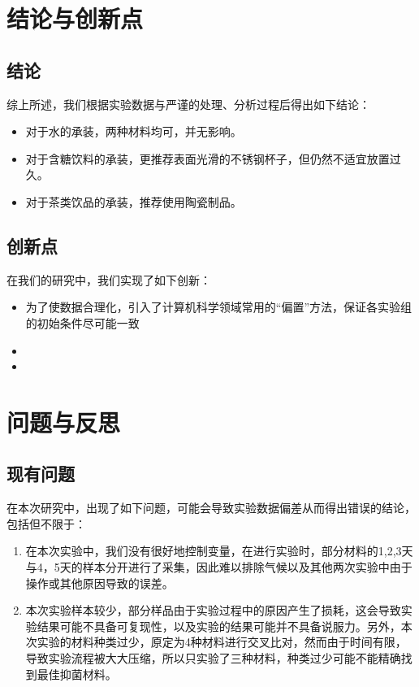 \documentclass[12pt,a4paper]{ctexart}
\begin{document}
\section{结论与创新点}
\subsection{结论}
综上所述，我们根据实验数据与严谨的处理、分析过程后得出如下结论：
\begin{itemize}
    \item 对于水的承装，两种材料均可，并无影响。
    \item 对于含糖饮料的承装，更推荐表面光滑的不锈钢杯子，但仍然不适宜放置过久。
    \item 对于茶类饮品的承装，推荐使用陶瓷制品。
\end{itemize}

\subsection{创新点}
在我们的研究中，我们实现了如下创新：
\begin{itemize}
    \item 为了使数据合理化，引入了计算机科学领域常用的“偏置”方法，保证各实验组的初始条件尽可能一致
    \item %
    \item %
\end{itemize}

\section{问题与反思}\label{sec:problem}
\subsection{现有问题}
在本次研究中，出现了如下问题，可能会导致实验数据偏差从而得出错误的结论，包括但不限于：
\begin{enumerate}
    \item 在本次实验中，我们没有很好地控制变量，在进行实验时，部分材料的1,2,3天与4，5天的样本分开进行了采集，因此难以排除气候以及其他两次实验中由于操作或其他原因导致的误差。
    \item 本次实验样本较少，部分样品由于实验过程中的原因产生了损耗，这会导致实验结果可能不具备可复现性，以及实验的结果可能并不具备说服力。另外，本次实验的材料种类过少，原定为4种材料进行交叉比对，然而由于时间有限，导致实验流程被大大压缩，所以只实验了三种材料，种类过少可能不能精确找到最佳抑菌材料。
\end{enumerate}
\end{document}
